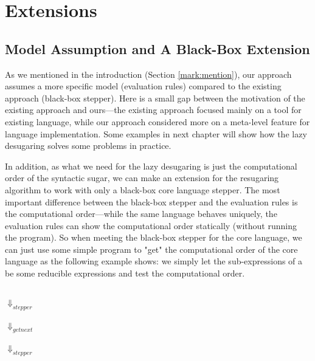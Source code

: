 \section{Extensions}
\label{sec5}
\ycomment{}
\subsection{Model Assumption and A Black-Box Extension}


As we mentioned in the introduction (Section \ref{mark:mention}), our approach assumes a more specific model (evaluation rules) compared to the existing approach (black-box stepper). Here is a small gap between the motivation of the existing approach and ours---the existing approach focused mainly on a tool for existing language, while our approach considered more on a meta-level feature for language implementation. Some examples in next chapter will show how the lazy desugaring solves some problems in practice.

In addition, as what we need for the lazy desugaring is just the computational order of the syntactic sugar, we can make an extension for the resugaring algorithm to work with only a black-box core language stepper. The most important difference between the black-box stepper and the evaluation rules is the computational order---while the same language behaves uniquely, the evaluation rules can show the computational order statically (without running the program). So when meeting the black-box stepper for the core language, we can just use some simple program to "get" the computational order of the core language as the following example  shows: we simply let the sub-expressions of a  be some reducible expressions and test the computational order.

\begin{center}\footnotesize
	\\ $\Downarrow_{stepper}$\\ \\ $\Downarrow_{getnext}$\\ \\ $\Downarrow_{stepper}$\\ \qquad{}\\
\end{center}


